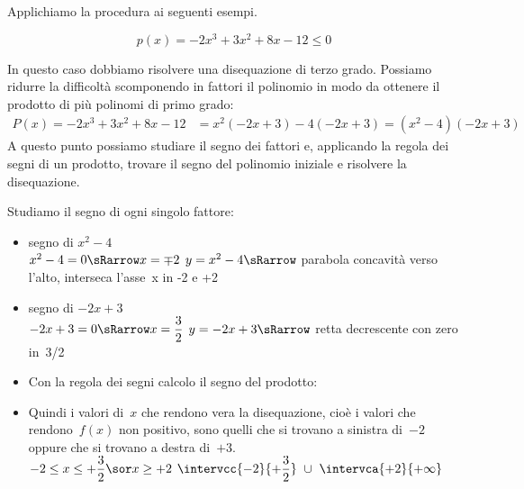 Applichiamo la procedura ai seguenti esempi.

\newpage %

\begin{esempio}
 \[p(x)=-2x^3+3x^2+8x-12 \le 0\]

In questo caso dobbiamo risolvere una disequazione di terzo grado. 
Possiamo ridurre la difficoltà scomponendo in fattori il polinomio in modo da 
ottenere il prodotto di più polinomi di primo grado:
\begin{align*}
P(x) = -2x^3+3x^2+8x-12 &= x^2(-2x+3)-4(-2x+3) = (x^2-4)(-2x+3)
\end{align*}
A questo punto possiamo studiare il segno dei fattori e, applicando la regola 
dei segni di un prodotto, trovare il segno del polinomio iniziale e risolvere 
la disequazione.

Studiamo il segno di ogni singolo fattore:
\begin{itemize}

 \item segno di \(x^2-4\)\\
 \segnofatt
   {\(x^2-4=0 \sRarrow x=\mp 2\)}
   {\(y=x^2-4 \sRarrow\)}
   {parabola concavità verso l'alto, interseca l'asse~x in -2 e +2}
   {}
 \item  segno di \(-2x+3\)\\
 \segnofatt
   {\(-2x+3=0 \sRarrow x=\dfrac{3}{2}\)}
   {\(y=-2x+3 \sRarrow \)}
   {retta decrescente con zero in~3/2}
   {}
 \item 
 \vspace{-1em} 
 Con la regola dei segni calcolo il segno del prodotto:
 \vspace{-1em}

\begin{inaccessibleblock}
  \begin{center}
  \segnoprodottoa
  \end{center}
\end{inaccessibleblock}

 \item 
 \vspace{-1em}
 Quindi i valori di~\(x\) che rendono vera la disequazione, cioè i 
valori che rendono~\(f(x)\) non positivo, sono quelli 
che si trovano a sinistra di~\(-2\) oppure che si trovano a destra 
di~\(+3\).\\
 \insiemesoluzione
   {\solprodottoa}
   {\(-2 \le x \le +\dfrac{3}{2} \sor x \ge +2\)}
   {\(\intervcc{-2}{+\dfrac{3}{2}}~\cup~\intervca{+2}{+\infty}\)}
\end{itemize}
\end{esempio}

